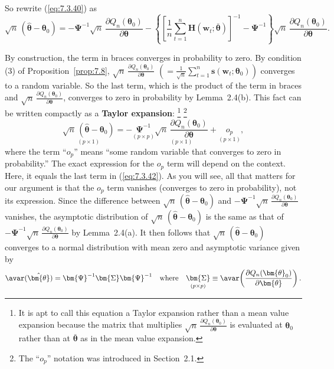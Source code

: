So rewrite (\ref{eq:7.3.40}) as
\begin{equation}
\label{eq:7.3.42}
\sqrt{n}\,(\hat{\bm{\theta}} - \bm{\theta}_0) = -\bm{\Psi}^{-1}\sqrt{n}\,\frac{\partial Q_n(\bm{\theta}_0)}{\partial\bm{\theta}} - \left\{\left[\frac{1}{n}\sum_{t=1}^{n}\mathbf{H}(\mathbf{w}_t; \bar{\bm{\theta}})\right]^{-1} - \bm{\Psi}^{-1}\right\}\sqrt{n}\,\frac{\partial Q_n(\bm{\theta}_0)}{\partial\bm{\theta}}.
\end{equation}

By construction, the term in braces converges in probability to zero. By condition (3) of Proposition~\ref{prop:7.8}, $\sqrt{n}\,\frac{\partial Q_n(\bm{\theta}_0)}{\partial\bm{\theta}}$ $(= \frac{1}{\sqrt{n}}\sum_{t=1}^{n}\mathbf{s}(\mathbf{w}_t; \bm{\theta}_0))$ converges to a random variable. So the last term, which is the product of the term in braces and $\sqrt{n}\,\frac{\partial Q_n(\bm{\theta}_0)}{\partial\bm{\theta}}$, converges to zero in probability by Lemma~2.4(b). This fact can be written compactly as a \textbf{Taylor expansion}:%
\footnote{It is apt to call this equation a Taylor expansion rather than a mean value expansion because the matrix that multiplies $\sqrt{n}\,\frac{\partial Q_n(\bm{\theta}_0)}{\partial\bm{\theta}}$ is evaluated at $\bm{\theta}_0$ rather than at $\bar{\bm{\theta}}$ as in the mean value expansion.}%
\footnote{The ``$o_p$'' notation was introduced in Section~2.1.}
\begin{equation}
\label{eq:7.3.43}
\underset{(p \times 1)}{\sqrt{n}\,(\hat{\bm{\theta}} - \bm{\theta}_0)} = -\underset{(p \times p)}{\bm{\Psi}^{-1}} \underset{(p \times 1)}{\sqrt{n}\,\frac{\partial Q_n(\bm{\theta}_0)}{\partial\bm{\theta}}} + \underset{(p \times 1)}{o_p},
\end{equation}
where the term ``$o_p$'' means ``some random variable that converges to zero in probability.'' The exact expression for the $o_p$ term will depend on the context. Here, it equals the last term in (\ref{eq:7.3.42}). As you will see, all that matters for our argument is that the $o_p$ term vanishes (converges to zero in probability), not its expression. Since the difference between $\sqrt{n}\,(\hat{\bm{\theta}} - \bm{\theta}_0)$ and $-\bm{\Psi}^{-1}\sqrt{n}\,\frac{\partial Q_n(\bm{\theta}_0)}{\partial\bm{\theta}}$ vanishes, the asymptotic distribution of $\sqrt{n}\,(\hat{\bm{\theta}} - \bm{\theta}_0)$ is the same as that of $-\bm{\Psi}^{-1}\sqrt{n}\,\frac{\partial Q_n(\bm{\theta}_0)}{\partial\bm{\theta}}$ by Lemma~2.4(a). It then follows that $\sqrt{n}\,(\hat{\bm{\theta}} - \bm{\theta}_0)$ converges to a normal distribution with mean zero and asymptotic variance given by
\begin{equation}
\label{eq:7.3.44}
\avar(\hat{\bm{\theta}}) = \bm{\Psi}^{-1}\bm{\Sigma}\bm{\Psi}^{-1} \quad \text{where} \quad \underset{(p \times p)}{\bm{\Sigma}} \equiv \avar\!\left(\frac{\partial Q_n(\bm{\theta}_0)}{\partial\bm{\theta}}\right).
\end{equation}

